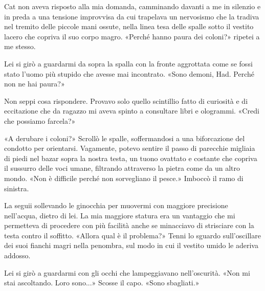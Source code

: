 Cat non aveva risposto alla mia domanda, camminando davanti a me in
silenzio e in preda a una tensione improvvisa da cui trapelava un
nervosismo che la tradiva nel tremito delle piccole mani ossute, nella
linea tesa delle spalle sotto il vestito lacero che copriva il suo corpo
magro. «Perché hanno paura dei coloni?» ripetei a me stesso.

Lei si girò a guardarmi da sopra la spalla con la fronte aggrottata come
se fossi stato l'uomo più stupido che avesse mai incontrato. «Sono
demoni, Had. Perché non ne hai paura?»

Non seppi cosa rispondere. Provavo solo quello scintillio fatto di
curiosità e di eccitazione che da ragazzo mi aveva spinto a consultare
libri e ologrammi. «Credi che possiamo farcela?»

«A derubare i coloni?» Scrollò le spalle, soffermandosi a una
biforcazione del condotto per orientarsi. Vagamente, potevo sentire il
passo di parecchie migliaia di piedi nel bazar sopra la nostra testa, un
tuono ovattato e costante che copriva il sussurro delle voci umane,
filtrando attraverso la pietra come da un altro mondo. «Non è difficile
perché non sorvegliano il pesce.» Imboccò il ramo di sinistra.

La seguii sollevando le ginocchia per muovermi con maggiore precisione
nell'acqua, dietro di lei. La mia maggiore statura era un vantaggio che
mi permetteva di procedere con più facilità anche se minacciavo di
strisciare con la testa contro il soffitto. «Allora qual è il problema?»
Tenni lo sguardo sull'oscillare dei suoi fianchi magri nella penombra,
sul modo in cui il vestito umido le aderiva addosso.

Lei si girò a guardarmi con gli occhi che lampeggiavano nell'oscurità.
«Non mi stai ascoltando. Loro sono...» Scosse il capo. «Sono sbagliati.»

\begin{figure}
	\centering
	\def\svgwidth{\columnwidth}
	\scalebox{0.2}{}
\end{figure}

